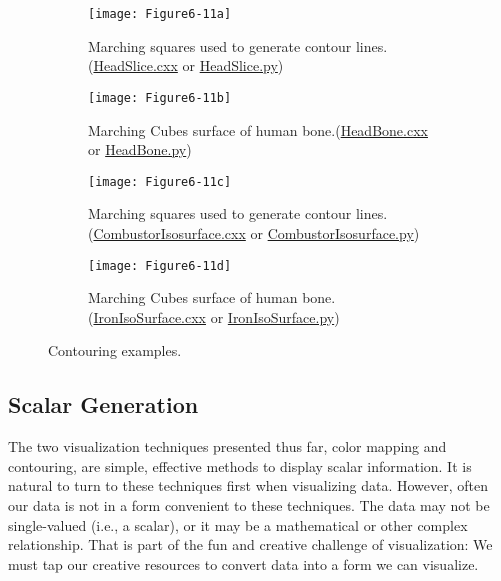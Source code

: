 \begin{figure}[htb]
	\begin{subfigure}[h]{0.48\linewidth}
		\texttt{[image: Figure6-11a]}
		\caption{Marching squares used to generate contour lines.(\href{https://lorensen.github.io/VTKExamples/site/Cxx/VisualizationAlgorithms/HeadSlice}{HeadSlice.cxx} or \href{https://lorensen.github.io/VTKExamples/site/Python/VisualizationAlgorithms/HeadSlice/}{HeadSlice.py})}\label{fig:Figure6-11a}
	\end{subfigure}
	\hfill
	\begin{subfigure}[h]{0.48\linewidth}
		\texttt{[image: Figure6-11b]}
		\caption{Marching Cubes surface of human bone.(\href{https://lorensen.github.io/VTKExamples/site/Cxx/VisualizationAlgorithms/HeadBone}{HeadBone.cxx} or \href{https://lorensen.github.io/VTKExamples/site/Python/VisualizationAlgorithms/HeadBone/}{HeadBone.py})}\label{fig:Figure6-11b}
	\end{subfigure}%
	\hfill
	\begin{subfigure}[h]{0.48\linewidth}
		\texttt{[image: Figure6-11c]}
		\caption{Marching squares used to generate contour lines.(\href{https://lorensen.github.io/VTKExamples/site/Cxx/VisualizationAlgorithms/CombustorIsosurface}{CombustorIsosurface.cxx} or \href{https://lorensen.github.io/VTKExamples/site/Python/VisualizationAlgorithms/CombustorIsosurface/}{CombustorIsosurface.py})}\label{fig:Figure6-11c}
	\end{subfigure}
	\hfill
	\begin{subfigure}[h]{0.48\linewidth}
		\texttt{[image: Figure6-11d]}
		\caption{Marching Cubes surface of human bone.(\href{https://lorensen.github.io/VTKExamples/site/Cxx/VisualizationAlgorithms/IronIsoSurface}{IronIsoSurface.cxx} or \href{https://lorensen.github.io/VTKExamples/site/Python/VisualizationAlgorithms/IronIsoSurface/}{IronIsoSurface.py})}\label{fig:Figure6-11d}
	\end{subfigure}%
	\caption{Contouring examples.}\label{fig:Figure6-11}
\end{figure}

\subsection{Scalar Generation}
\label{subsec:scalar_generation}

The two visualization techniques presented thus far, color mapping and contouring, are simple, effective methods to display scalar information. It is natural to turn to these techniques first when visualizing data. However, often our data is not in a form convenient to these techniques. The data may not be single-valued (i.e., a scalar), or it may be a mathematical or other complex relationship. That is part of the fun and creative challenge of visualization: We must tap our creative resources to convert data into a form we can visualize.

